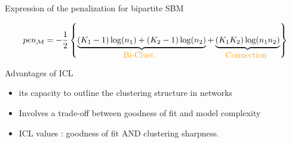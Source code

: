 \documentclass[compress,10pt]{beamer}
\begin{document}
 \begin{frame}{Expression of the penalization for bipartite  SBM}

$$ pen_{\mathcal{M}} =  -  \frac{1}{2}  \left\{  \underbrace{ (K_1-1)\log(n_1) +  (K_2-1)\log(n_2)  }_{\mbox{\textcolor{dgreen}{Bi-Clust. }}} 
  +   \underbrace{ (K_1  K_2)    \log ( n_1   n_2)} _{\mbox{\textcolor{dgreen}{Connection }}} \right\} $$ 


\end{frame}
 

\begin{frame}{Advantages of ICL}

 
\begin{itemize}
\item its capacity to outline the clustering structure in networks%
\item Involves a trade-off between goodness of fit and model complexity
\item ICL values :   goodness of fit  AND clustering  sharpness.
 
\end{itemize}

\end{frame}

 
\end{document}
